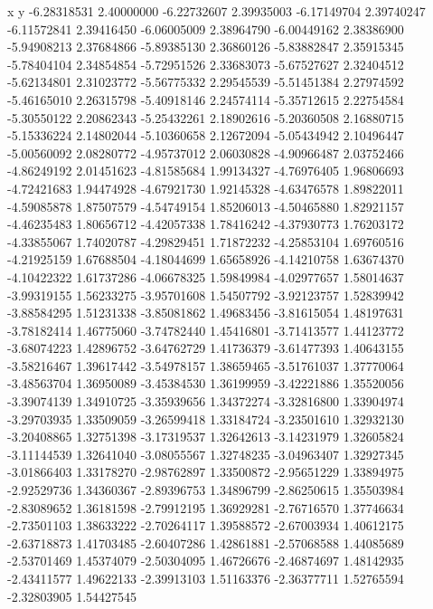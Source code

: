 x y      
-6.28318531  2.40000000  
-6.22732607  2.39935003  
-6.17149704  2.39740247  
-6.11572841  2.39416450  
-6.06005009  2.38964790  
-6.00449162  2.38386900  
-5.94908213  2.37684866  
-5.89385130  2.36860126  
-5.83882847  2.35915345  
-5.78404104  2.34854854  
-5.72951526  2.33683073  
-5.67527627  2.32404512  
-5.62134801  2.31023772  
-5.56775332  2.29545539  
-5.51451384  2.27974592  
-5.46165010  2.26315798  
-5.40918146  2.24574114  
-5.35712615  2.22754584  
-5.30550122  2.20862343  
-5.25432261  2.18902616  
-5.20360508  2.16880715  
-5.15336224  2.14802044  
-5.10360658  2.12672094  
-5.05434942  2.10496447  
-5.00560092  2.08280772  
-4.95737012  2.06030828  
-4.90966487  2.03752466  
-4.86249192  2.01451623  
-4.81585684  1.99134327  
-4.76976405  1.96806693  
-4.72421683  1.94474928  
-4.67921730  1.92145328  
-4.63476578  1.89822011  
-4.59085878  1.87507579  
-4.54749154  1.85206013  
-4.50465880  1.82921157  
-4.46235483  1.80656712  
-4.42057338  1.78416242  
-4.37930773  1.76203172  
-4.33855067  1.74020787  
-4.29829451  1.71872232  
-4.25853104  1.69760516  
-4.21925159  1.67688504  
-4.18044699  1.65658926  
-4.14210758  1.63674370  
-4.10422322  1.61737286  
-4.06678325  1.59849984  
-4.02977657  1.58014637  
-3.99319155  1.56233275  
-3.95701608  1.54507792  
-3.92123757  1.52839942  
-3.88584295  1.51231338  
-3.85081862  1.49683456  
-3.81615054  1.48197631  
-3.78182414  1.46775060  
-3.74782440  1.45416801  
-3.71413577  1.44123772  
-3.68074223  1.42896752  
-3.64762729  1.41736379  
-3.61477393  1.40643155  
-3.58216467  1.39617442  
-3.54978157  1.38659465  
-3.51761037  1.37770064  
-3.48563704  1.36950089  
-3.45384530  1.36199959  
-3.42221886  1.35520056  
-3.39074139  1.34910725  
-3.35939656  1.34372274  
-3.32816800  1.33904974  
-3.29703935  1.33509059  
-3.26599418  1.33184724  
-3.23501610  1.32932130  
-3.20408865  1.32751398  
-3.17319537  1.32642613  
-3.14231979  1.32605824  
-3.11144539  1.32641040  
-3.08055567  1.32748235  
-3.04963407  1.32927345  
-3.01866403  1.33178270  
-2.98762897  1.33500872  
-2.95651229  1.33894975  
-2.92529736  1.34360367  
-2.89396753  1.34896799  
-2.86250615  1.35503984  
-2.83089652  1.36181598  
-2.79912195  1.36929281  
-2.76716570  1.37746634  
-2.73501103  1.38633222  
-2.70264117  1.39588572  
-2.67003934  1.40612175  
-2.63718873  1.41703485  
-2.60407286  1.42861881  
-2.57068588  1.44085689  
-2.53701469  1.45374079  
-2.50304095  1.46726676  
-2.46874697  1.48142935  
-2.43411577  1.49622133  
-2.39913103  1.51163376  
-2.36377711  1.52765594  
-2.32803905  1.54427545  
